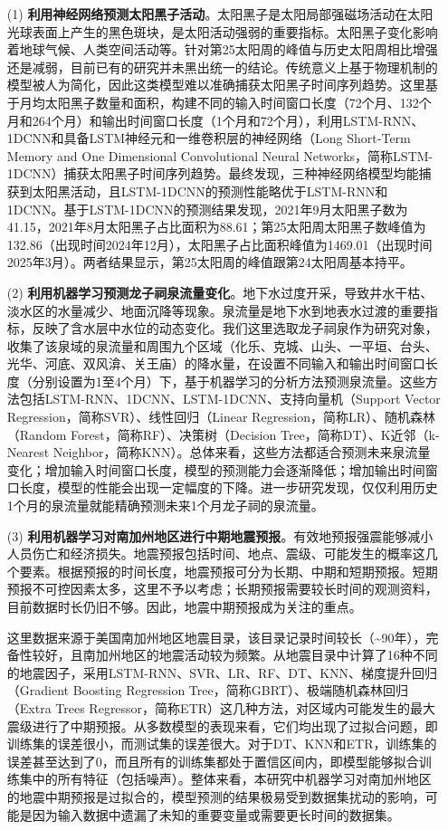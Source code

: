 \begin{enumerate}

  \item[(1)] \textbf{利用神经网络预测太阳黑子活动}。太阳黑子是太阳局部强磁场活动在太阳光球表面上产生的黑色斑块，是太阳活动强弱的重要指标。太阳黑子变化影响着地球气候、人类空间活动等。针对第25太阳周的峰值与历史太阳周相比增强还是减弱，目前已有的研究并未黑出统一的结论。传统意义上基于物理机制的模型被人为简化，因此这类模型难以准确捕获太阳黑子时间序列趋势。这里基于月均太阳黑子数量和面积，构建不同的输入时间窗口长度（72个月、132个月和264个月）和输出时间窗口长度（1个月和72个月），利用LSTM-RNN、1DCNN和具备LSTM神经元和一维卷积层的神经网络（Long Short-Term Memory and One Dimensional Convolutional Neural Networks，简称LSTM-1DCNN）捕获太阳黑子时间序列趋势。最终发现，三种神经网络模型均能捕获到太阳黑活动，且LSTM-1DCNN的预测性能略优于LSTM-RNN和1DCNN。基于LSTM-1DCNN的预测结果发现，2021年9月太阳黑子数为41.15，2021年8月太阳黑子占比面积为88.61；第25太阳周太阳黑子数峰值为132.86（出现时间2024年12月），太阳黑子占比面积峰值为1469.01（出现时间2025年3月）。两者结果显示，第25太阳周的峰值跟第24太阳周基本持平。

  \item[{(2)}] \textbf{利用机器学习预测龙子祠泉流量变化}。地下水过度开采，导致井水干枯、淡水区的水量减少、地面沉降等现象。泉流量是地下水到地表水过渡的重要指标，反映了含水层中水位的动态变化。我们这里选取龙子祠泉作为研究对象，收集了该泉域的泉流量和周围九个区域（化乐、克城、山头、一平垣、台头、光华、河底、双风渰、关王庙）的降水量，在设置不同输入和输出时间窗口长度（分别设置为1至4个月）下，基于机器学习的分析方法预测泉流量。这些方法包括LSTM-RNN、1DCNN、LSTM-1DCNN、支持向量机（Support Vector Regression，简称SVR）、线性回归（Linear Regression，简称LR）、随机森林（Random Forest，简称RF）、决策树（Decision Tree，简称DT）、K近邻（k-Nearest Neighbor，简称KNN）。总体来看，这些方法都适合预测未来泉流量变化；增加输入时间窗口长度，模型的预测能力会逐渐降低；增加输出时间窗口长度，模型的性能会出现一定幅度的下降。进一步研究发现，仅仅利用历史1个月的泉流量就能精确预测未来1个月龙子祠的泉流量。
  
  \item[(3)] \textbf{利用机器学习对南加州地区进行中期地震预报}。有效地预报强震能够减小人员伤亡和经济损失。地震预报包括时间、地点、震级、可能发生的概率这几个要素。根据预报的时间长度，地震预报可分为长期、中期和短期预报。短期预报不可控因素太多，这里不予以考虑；长期预报需要较长时间的观测资料，目前数据时长仍旧不够。因此，地震中期预报成为关注的重点。
  
  这里数据来源于美国南加州地区地震目录，该目录记录时间较长（\sim 90年），完备性较好，且南加州地区的地震活动较为频繁。从地震目录中计算了16种不同的地震因子，采用LSTM-RNN、SVR、LR、RF、DT、KNN、梯度提升回归（Gradient Boosting Regression Tree，简称GBRT）、极端随机森林回归（Extra Trees Regressor，简称ETR）这几种方法，对区域内可能发生的最大震级进行了中期预报。从多数模型的表现来看，它们均出现了过拟合问题，即训练集的误差很小，而测试集的误差很大。对于DT、KNN和ETR，训练集的误差甚至达到了0，而且所有的训练集都处于置信区间内，即模型能够拟合训练集中的所有特征（包括噪声）。整体来看，本研究中机器学习对南加州地区的地震中期预报是过拟合的，模型预测的结果极易受到数据集扰动的影响，可能是因为输入数据中遗漏了未知的重要变量或需要更长时间的数据集。


\end{enumerate}
